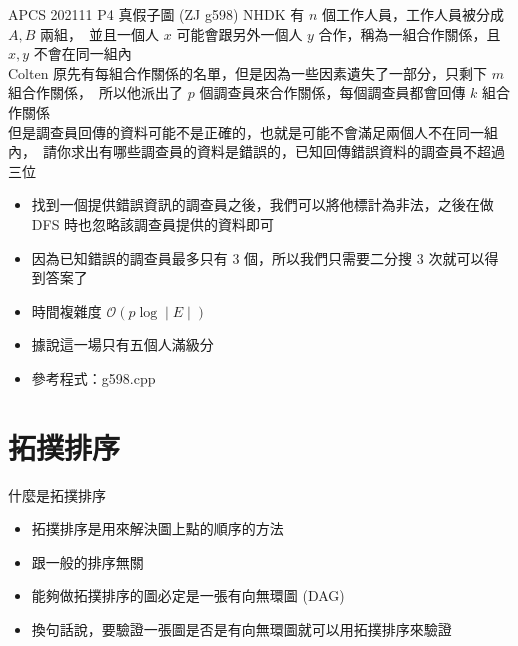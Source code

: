 \documentclass[aspectratio=169]{beamer}
\begin{document}
    \begin{frame}
        \begin{block}{APCS 202111 P4 真假子圖 (ZJ g598)}
            NHDK 有 $n$ 個工作人員，工作人員被分成 $A, B$ 兩組，\
            並且一個人 $x$ 可能會跟另外一個人 $y$ 合作，稱為一組合作關係，且 $x, y$ 不會在同一組內\\
            Colten 原先有每組合作關係的名單，但是因為一些因素遺失了一部分，只剩下 $m$ 組合作關係，\
            所以他派出了 $p$ 個調查員來合作關係，每個調查員都會回傳 $k$ 組合作關係\\
            但是調查員回傳的資料可能不是正確的，也就是可能不會滿足兩個人不在同一組內，\
            請你求出有哪些調查員的資料是錯誤的，已知回傳錯誤資料的調查員不超過三位
        \end{block}

        \begin{itemize}
            \item<1-> 找到一個提供錯誤資訊的調查員之後，我們可以將他標計為非法，之後在做 DFS 時也忽略該調查員提供的資料即可
            \item<2-> 因為已知錯誤的調查員最多只有 3 個，所以我們只需要二分搜 3 次就可以得到答案了
            \item<3-> 時間複雜度 $\mathcal{O}(p\log \mid E \mid)$
            \item<3-> 據說這一場只有五個人滿級分
            \item<3-> 參考程式：g598.cpp
        \end{itemize}
    \end{frame}

    \section{拓撲排序}

    \begin{frame}{什麼是拓撲排序}
        \begin{itemize}
            \item<1-> 拓撲排序是用來解決圖上點的順序的方法
            \item<1-> 跟一般的排序無關
            \item<2-> 能夠做拓撲排序的圖必定是一張有向無環圖 (DAG)
            \item<2-> 換句話說，要驗證一張圖是否是有向無環圖就可以用拓撲排序來驗證
        \end{itemize}
    \end{frame}
\end{document}
